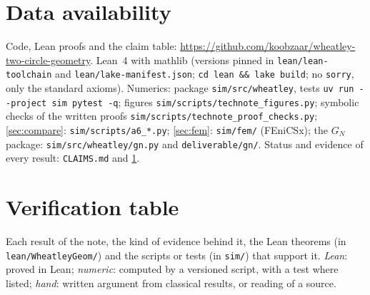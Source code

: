 \documentclass[11pt,a4paper]{article}
\theoremstyle{plain}
\theoremstyle{remark}
\newcommand{\repourl}{\url{https://github.com/koobzaar/wheatley-two-circle-geometry}}
\begin{document}
\section*{Data availability}
{\raggedright
Code, Lean proofs and the claim table: \repourl. Lean~4 with mathlib (versions pinned in \texttt{lean/lean-toolchain} and
\texttt{lean/lake-manifest.json}; \texttt{cd lean \&\& lake build}; no \texttt{sorry}, only the standard axioms). Numerics:
package \texttt{sim/src/wheatley}, tests \texttt{uv run -{}-project sim pytest -q}; figures \texttt{sim/scripts/technote\_figures.py};
symbolic checks of the written proofs \texttt{sim/scripts/technote\_proof\_checks.py}; \cref{sec:compare}:
\texttt{sim/scripts/a6\_*.py}; \cref{sec:fem}: \texttt{sim/fem/} (FEniCSx); the $G_N$ package: \texttt{sim/src/wheatley/gn.py} and
\texttt{deliverable/gn/}. Status and evidence of every result: \texttt{CLAIMS.md} and \cref{app:verification}.\par}




\appendix
\section{Verification table}\label{app:verification}
Each result of the note, the kind of evidence behind it, the Lean theorems (in \texttt{lean/WheatleyGeom/}) and the scripts
or tests (in \texttt{sim/}) that support it. \emph{Lean}: proved in Lean; \emph{numeric}: computed by a versioned script,
with a test where listed; \emph{hand}: written argument from classical results, or reading of a source.
{\small}
\end{document}
